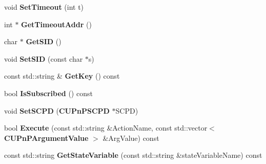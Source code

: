 \begin{DoxyCompactItemize}
\item 
void {\bfseries SetTimeout} (int t)\label{classCUPnPService_a65a646363b7cfe9362b081fe6829bab4}

\item 
int $\ast$ {\bfseries GetTimeoutAddr} ()\label{classCUPnPService_a43134efccc53871b6e713bf211322b6d}

\item 
char $\ast$ {\bfseries GetSID} ()\label{classCUPnPService_a944667ce2e6406a37fd9ddffc068e560}

\item 
void {\bfseries SetSID} (const char $\ast$s)\label{classCUPnPService_acef262d1fed13cbf7c5affc5f0ea1892}

\item 
const std::string \& {\bfseries GetKey} () const \label{classCUPnPService_adb0f4d2003773b8eb499c0ef2847940a}

\item 
bool {\bfseries IsSubscribed} () const \label{classCUPnPService_a110e38d151c5d8dcdb7ea4b24a9c749e}

\item 
void {\bfseries SetSCPD} ({\bf CUPnPSCPD} $\ast$SCPD)\label{classCUPnPService_aef719279193fb87380f156fec36fb23b}

\item 
bool {\bfseries Execute} (const std::string \&ActionName, const std::vector$<$ {\bf CUPnPArgumentValue} $>$ \&ArgValue) const \label{classCUPnPService_aacd89aad08802b1722268527a8145524}

\item 
const std::string {\bfseries GetStateVariable} (const std::string \&stateVariableName) const \label{classCUPnPService_a6bbd862c00fae8e5bc1a72aa95242929}

\end{DoxyCompactItemize}
